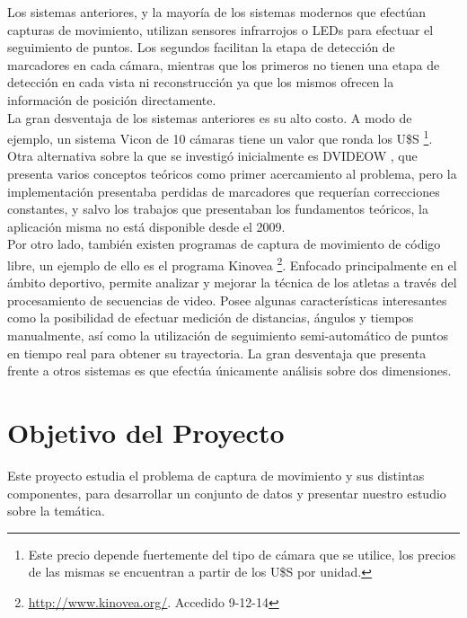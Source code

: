 Los sistemas anteriores, y la mayoría de los sistemas modernos que efectúan capturas de movimiento, utilizan sensores infrarrojos o LEDs para efectuar el seguimiento de puntos. Los segundos facilitan la etapa de detección de marcadores en cada cámara, mientras que los primeros no tienen una etapa de detección en cada vista ni reconstrucción ya que los mismos ofrecen la información de posición directamente.
\\ 

La gran desventaja de los sistemas anteriores es su alto costo. A modo de ejemplo, un sistema Vicon de 10 cámaras tiene un valor que ronda los U\$S \footnote{Este precio depende fuertemente del tipo de cámara que se utilice, los precios de las mismas se encuentran a partir de los U\$S por unidad.}.
\\ 

Otra alternativa sobre la que se investigó inicialmente es DVIDEOW \cite{figueroa2003flexible}, que presenta varios conceptos teóricos como primer acercamiento al problema, pero la implementación presentaba perdidas de marcadores que requerían correcciones constantes, y salvo los trabajos que presentaban los fundamentos teóricos, la aplicación misma no está disponible desde el 2009.
\\ 

Por otro lado, también existen programas de captura de movimiento de código libre, un ejemplo de ello es el programa Kinovea
\footnote{ \textcolor{blue}{\underline{\url{http://www.kinovea.org/}}}. Accedido 9-12-14}. Enfocado principalmente en el ámbito deportivo, permite analizar y mejorar la técnica de los atletas a través del procesamiento de secuencias de video. Posee algunas características interesantes como la posibilidad de efectuar medición de distancias, ángulos y tiempos manualmente, así como la utilización de seguimiento semi-automático de puntos en tiempo real para obtener su trayectoria. La gran desventaja que presenta frente a otros sistemas es que efectúa únicamente análisis sobre dos dimensiones.

\section{Objetivo del Proyecto}

Este proyecto estudia el problema de captura de movimiento y sus distintas componentes, para desarrollar un conjunto de datos y presentar nuestro estudio sobre la temática. 
\\

